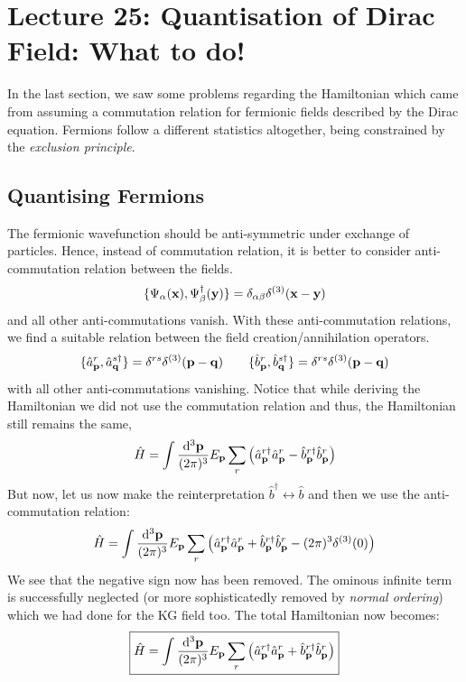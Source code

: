 \section*{Lecture 25: Quantisation of Dirac Field: What to do!}
In the last section, we saw some problems regarding the Hamiltonian which came from assuming a commutation relation for fermionic fields described by the Dirac equation. Fermions follow a different statistics altogether, being constrained by the \textit{exclusion principle}.

\subsection{Quantising Fermions}
The fermionic wavefunction should be anti-symmetric under exchange of particles. Hence, instead of commutation relation, it is better to consider anti-commutation relation between the fields.
$$\{\Psi_{\alpha}(\vb{x}), \Psi_{\beta}^\dagger(\vb{y})\} = \delta_{\alpha\beta}\delta^{(3)}(\vb{x}-\vb{y})$$
and all other anti-commutations vanish. With these anti-commutation relations, we find a suitable relation between the field creation/annihilation operators. 
\begin{equation}
    \{{\hat{a}_{\vb{p}}}^{r},{\hat{a}_{\vb{q}}}^{s\dagger}\} =\delta^{rs}\delta^{(3)}(\vb{p}-\vb{q})\qquad \{{\hat{b}_{\vb{p}}}^{r},{\hat{b}_{\vb{q}}}^{s\dagger}\} =\delta^{rs}\delta^{(3)}(\vb{p}-\vb{q})
\end{equation}
with all other anti-commutations vanishing. Notice that while deriving the Hamiltonian we did not use the commutation relation and thus, the Hamiltonian still remains the same,
$$\hat{H} = \int \frac{\dd^3\vb{{\vb{p}}}}{(2\pi)^3} E_{\vb{p}} \sum \limits_{r}\qty({\hat{a}_{\vb{p}}}^{r\dagger}{\hat{a}_{\vb{p}}}^{r} -{\hat{b}_{\vb{p}}}^{r\dagger}{\hat{b}_{\vb{p}}}^{r})$$
But now, let us now make the reinterpretation $\hat{b}^\dagger \leftrightarrow \hat{b}$ and then we use the anti-commutation relation:
$$\hat{H} = \int \frac{\dd^3\vb{{\vb{p}}}}{(2\pi)^3} E_{\vb{p}} \sum \limits_{r}\qty({\hat{a}_{\vb{p}}}^{r\dagger}{\hat{a}_{\vb{p}}}^{r} +{\hat{b}_{\vb{p}}}^{r\dagger}{\hat{b}_{\vb{p}}}^{r} - (2\pi)^3\delta^{(3)}(0)) $$
We see that the negative sign now has been removed. The ominous infinite term is successfully neglected (or more sophisticatedly removed by \textit{normal ordering}) which we had done for the KG field too. The total Hamiltonian now becomes:
$$\boxed{\hat{H} = \int \frac{\dd^3\vb{{\vb{p}}}}{(2\pi)^3} E_{\vb{p}} \sum \limits_{r}\qty({\hat{a}_{\vb{p}}}^{r\dagger}{\hat{a}_{\vb{p}}}^{r} +{\hat{b}_{\vb{p}}}^{r\dagger}{\hat{b}_{\vb{p}}}^{r})} $$
